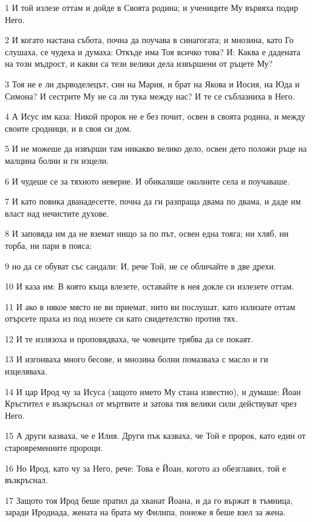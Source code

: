 \par 1 И той излезе оттам и дойде в Своята родина; и учениците Му вървяха подир Него.
\par 2 И когато настана събота, почна да поучава в синагогата; и мнозина, като Го слушаха, се чудеха и думаха: Откъде има Тоя всичко това? И: Каква е дадената на този мъдрост, и какви са тези велики дела извършени от ръцете Му?
\par 3 Тоя не е ли дърводелецът, син на Мария, и брат на Якова и Иосия, на Юда и Симона? И сестрите Му не са ли тука между нас? И те се съблазниха в Него.
\par 4 А Исус им каза: Никой пророк не е без почит, освен в своята родина, и между своите сродници, и в своя си дом.
\par 5 И не можеше да извърши там никакво велико дело, освен дето положи ръце на малцина болни и ги изцели.
\par 6 И чудеше се за тяхното неверие. И обикаляше околните села и поучаваше.
\par 7 И като повика дванадесетте, почна да ги разпраща двама по двама, и даде им власт над нечистите духове.
\par 8 И заповяда им да не вземат нищо за по път, освен една тояга; ни хляб, ни торба, ни пари в пояса;
\par 9 но да се обуват със сандали: И, рече Той, не се обличайте в две дрехи.
\par 10 И каза им: В която къща влезете, оставайте в нея докле си излезете оттам.
\par 11 И ако в някое място не ви приемат, нито ви послушат, като излизате оттам отърсете праха из под нозете си като свидетелство против тях.
\par 12 И те излязоха и проповядваха, че човеците трябва да се покаят.
\par 13 И изгонваха много бесове, и мнозина болни помазваха с масло и ги изцеляваха.
\par 14 И цар Ирод чу за Исуса (защото името Му стана известно), и думаше: Йоан Кръстител е възкръснал от мъртвите и затова тия велики сили действуват чрез Него.
\par 15 А други казваха, че е Илия. Други пък казваха, че Той е пророк, като един от старовременните пророци.
\par 16 Но Ирод, като чу за Него, рече: Това е Йоан, когото аз обезглавих, той е възкръснал.
\par 17 Защото тоя Ирод беше пратил да хванат Йоана, и да го вържат в тъмница, заради Иродиада, жената на брата му Филипа, понеже я беше взел за жена.
